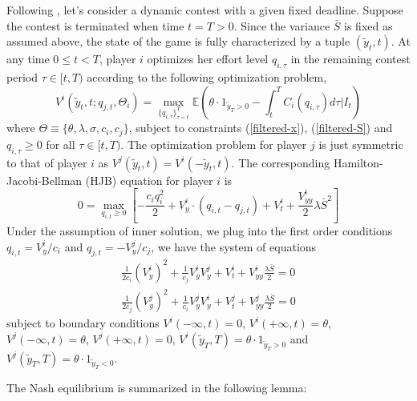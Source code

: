 \documentclass[a4paper, 11pt]{article}
\theoremstyle{plain} %
\begin{document}
Following \cite{ryvkin2022fight}, let's consider a dynamic contest with a given fixed deadline. 
Suppose the contest is terminated when time $t=T>0$. 
Since the variance $\bar{S}$ is fixed as assumed above, the state of the game is fully characterized by a tuple $(\tilde{y}_t, t)$. 
At any time $0\le t<T$, player $i$ optimizes her effort level $q_{i,\tau}$ in the remaining contest period $\tau\in[t, T)$ according to the following optimization problem, 
\begin{equation}\label{v-def}
	V^i(\tilde{y}_{t}, t ; q_{j,t},\Theta_i) = \max_{\{q_{i,\tau}\}^T_{\tau=t}} 
	\mathbb{E}\left( \theta\cdot1_{\tilde{y}_T>0} - \int^T_tC_i(q_{i,\tau})d\tau \bigg|I_t\right) 
\end{equation}
where $\Theta \equiv\{\theta, \lambda, \sigma, c_i, c_j\}$, subject to constraints (\ref{filtered-x}), (\ref{filtered-S}) and $q_{i,\tau}\ge0$ for all $\tau\in[t,T)$.
The optimization problem for player $j$ is just symmetric to that of player $i$ as $V^j(\tilde{y}_t, t) = V^i(-\tilde{y}_t, t)$. 
The corresponding Hamilton-Jacobi-Bellman (HJB) equation for player $i$ is 
\begin{equation*}
0 = \max_{q_{i,t}\ge0}\left[-\frac{c_iq_i^2}{2} + V^i_{y}\cdot\left(q_{i,t}-q_{j,t}\right)+V^i_t + \frac{V^i_{yy}}{2}\lambda \bar{S}^2\right]
\end{equation*}
Under the assumption of inner solution, we plug into the first order conditions $q_{i,t} = V^i_y/c_i$ and $q_{j,t} = -V^j_y/c_j$, we have the system of equations
\begin{equation*}
\begin{aligned}
\frac{1}{2c_i}(V^i_y)^2 + \frac{1}{c_j}V^i_yV^j_y + V^i_t + V^i_{yy}\frac{\lambda \bar{S}}{2} = 0\\
\frac{1}{2c_j}(V^j_y)^2 + \frac{1}{c_i}V^j_yV^i_y + V^j_t + V^j_{yy}\frac{\lambda \bar{S}}{2} = 0
\end{aligned}
\end{equation*}
subject to boundary conditions $V^i(-\infty, t) = 0$, $V^i(+\infty, t) = \theta$, $V^j(-\infty, t) = \theta$, $V^j(+\infty, t)=0$, $V^i(\tilde{y}_T, T) = \theta \cdot 1_{\tilde{y}_T > 0}$ and $V^j(\tilde{y}_T, T) = \theta \cdot 1_{\tilde{y}_T < 0}$. 


The Nash equilibrium is summarized in the following lemma: 
\end{document}
